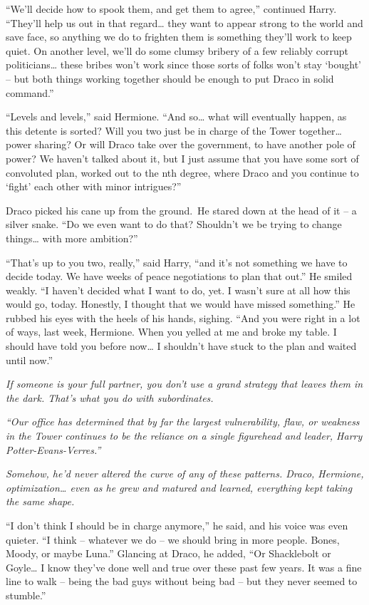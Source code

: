 ``We'll decide how to spook them, and get them to agree,'' continued
Harry. ``They'll help us out in that regard\ldots{} they want to appear
strong to the world and save face, so anything we do to frighten them is
something they'll work to keep quiet. On another level, we'll do some
clumsy bribery of a few reliably corrupt politicians\ldots{} these
bribes won't work since those sorts of folks won't stay `bought' -- but
both things working together should be enough to put Draco in solid
command.''

``Levels and levels,'' said Hermione. ``And so\ldots{} what will
eventually happen, as this detente is sorted? Will you two just be in
charge of the Tower together\ldots{} power sharing? Or will Draco take
over the government, to have another pole of power? We haven't talked
about it, but I just assume that you have some sort of convoluted plan,
worked out to the nth degree, where Draco and you continue to `fight'
each other with minor intrigues?''

Draco picked his cane up from the ground.~He stared down at the head of
it -- a silver snake. ``Do we even want to do that? Shouldn't we be
trying to change things\ldots{} with more ambition?''

``That's up to you two, really,'' said Harry, ``and it's not something
we have to decide today. We have weeks of peace negotiations to plan
that out.'' He smiled weakly. ``I haven't decided what I want to do,
yet. I wasn't sure at all how this would go, today. Honestly, I thought
that we would have missed something.'' He rubbed his eyes with the heels
of his hands, sighing. ``And you were right in a lot of ways, last week,
Hermione. When you yelled at me and broke my table. I should have told
you before now\ldots{} I shouldn't have stuck to the plan and waited
until now.''

\emph{If someone is your full partner, you don't use a grand strategy
that leaves them in the dark. That's what you do with subordinates.}

\emph{``Our office has determined that by far the largest vulnerability,
flaw, or weakness in the Tower continues to be the reliance on a single
figurehead and leader, Harry Potter-Evans-Verres.''}

\emph{Somehow, he'd never altered the curve of any of these patterns.
Draco, Hermione, optimization\ldots{} even as he grew and matured and
learned, everything kept taking the same shape.}

``I don't think I should be in charge anymore,'' he said, and his voice
was even quieter. ``I think -- whatever we do -- we should bring in more
people. Bones, Moody, or maybe Luna.'' Glancing at Draco, he added, ``Or
Shacklebolt or Goyle\ldots{} I know they've done well and true over
these past few years. It was a fine line to walk -- being the bad guys
without being bad -- but they never seemed to stumble.''

